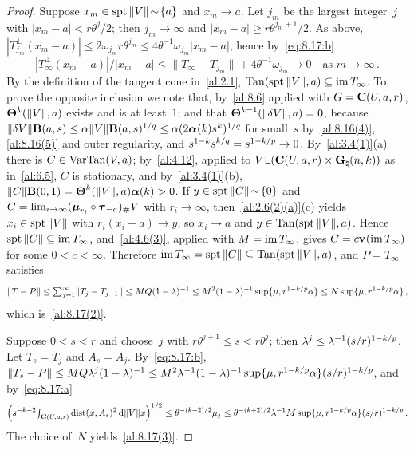 \begin{proof}
    Suppose $x_m \in \operatorname{spt} \|V\| \!\sim\! \{ a \}$ and $x_m \to a$. Let $j_m$ be the largest
    integer~$j$ with $|x_m - a| < r \theta^j/2$; then $j_m \to \infty$ and $|x_m - a| \ge r
    \theta^{j_m + 1}/2$. As above, $|T_{j_m}^\perp(x_m - a)| \le 2 \omega_{j_m} r \theta^{j_m} \le
    4 \theta^{-1} \omega_{j_m} |x_m - a|$, hence by~\eqref{eq:8.17:b}
    \begin{displaymath}
        |T_\infty^\perp(x_m - a)| / |x_m - a| \le \|T_\infty - T_{j_m}\| + 4 \theta^{-1}
        \omega_{j_m} \to 0 \quad \text{as $m \to \infty$} \,.
    \end{displaymath}
    By the definition of the tangent cone in~\ref{al:2.1}, $\operatorname{Tan}(\operatorname{spt} \|V\|, a) \subseteq \operatorname{im}
    T_\infty$. To prove the opposite inclusion we note that, by~\ref{al:8.6} applied with $G =
    \mathbf{C} ( U, a, r )$, $\boldsymbol{\Theta}^{k}(\|V\|,a)$ exists and is at least~$1$; and that
    $\boldsymbol{\Theta}^{k-1}(\|\delta V\|, a) = 0$, because $\|\delta V\| \mathbf{B}(a,s) \le \alpha \|V\|
    \mathbf{B}(a,s)^{1/q} \le \alpha (2 \boldsymbol{\alpha}(k) s^{k})^{1/q}$ for small~$s$
    by~\ref{al:8.16(4)}, \ref{al:8.16(5)} and outer regularity, and $s^{1 - k} s^{k/q} =
    s^{1 - k/p} \to 0$. By~\ref{al:3.4(1)}(a) there is $C \in \operatorname{VarTan}(V,a)$; by~\ref{al:4.12},
    applied to $V \restrict (\cylind{U}{a}{r} \times \pgrass{\adim}{\vdim})$ as in~\ref{al:6.5},
    $C$ is stationary, and by~\ref{al:3.4(1)}(b), $\|C\| \mathbf{B}(0,1) = \boldsymbol{\Theta}^{k}(\|V\|,a)
    \boldsymbol{\alpha}(k) > 0$. If $y \in \operatorname{spt} \|C\| \!\sim\! \{0\}$ and $C = \lim_{i \to \infty}
    (\boldsymbol{\mu}_{r_i} \circ \boldsymbol{\tau}_{-a})_\# V$ with $r_i \to \infty$, then~\ref{al:2.6(2)(a)}(c) yields
    $x_i \in \operatorname{spt} \|V\|$ with $r_i(x_i - a) \to y$, so $x_i \to a$ and $y \in \operatorname{Tan}(\operatorname{spt} \|V\|, a)$.
    Hence $\operatorname{spt} \|C\| \subseteq \operatorname{im} T_\infty$, and~\ref{al:4.6(3)}, applied with $M = \operatorname{im}
    T_\infty$, gives $C = c \mathbf{v}_{}(\operatorname{im} T_\infty)$ for some $0 < c < \infty$. Therefore $\operatorname{im} T_\infty
    = \operatorname{spt} \|C\| \subseteq \operatorname{Tan}(\operatorname{spt} \|V\|, a)$, and $P = T_\infty$ satisfies
    \begin{displaymath}
        \|T - P\| \le {\textstyle\sum_{j=1}^{\infty}} \|T_j - T_{j-1}\| \le M Q (1 - \lambda)^{-1} \le M^2 (1
        - \lambda)^{-1} \sup \{ \mu, r^{1 - k/p} \alpha \} \le N \sup \{ \mu, r^{1 - k/p}
        \alpha \} \,,
    \end{displaymath}
    which is~\ref{al:8.17(2)}.

    Suppose $0 < s < r$ and choose~$j$ with $r \theta^{j+1} \le s < r \theta^j$; then $\lambda^j \le
    \lambda^{-1} (s/r)^{1 - k/p}$. Let $T_s = T_j$ and $A_s = A_j$. By~\eqref{eq:8.17:b},
    $\|T_s - P\| \le M Q \lambda^j (1 - \lambda)^{-1} \le M^2 \lambda^{-1} (1 - \lambda)^{-1} \sup
    \{ \mu, r^{1 - k/p} \alpha \} (s/r)^{1 - k/p}$, and by~\eqref{eq:8.17:a}
    \begin{displaymath}
        \Big( s^{-k-2} {\textstyle\int_{\mathbf{C} ( U, a, s )}^{}} \operatorname{dist}(x, A_s)^2 \,\mathrm{d} \|V\| x \Big)^{1/2} \le
        \theta^{-(k+2)/2} \mu_j \le \theta^{-(k+2)/2} \lambda^{-1} M \sup \{ \mu, r^{1 -
        k/p} \alpha \} (s/r)^{1 - k/p} \,.
    \end{displaymath}
    The choice of~$N$ yields~\ref{al:8.17(3)}.
\end{proof}

